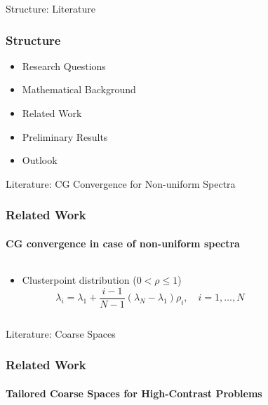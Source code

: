 \begin{frame}[label=literature]{Structure: Literature}
    \frametitle{Structure}
    \begin{itemize}
        \item Research Questions
        \item Mathematical Background
        \item {\color{tud grapefruit}Related Work}
        \item Preliminary Results
        \item Outlook
    \end{itemize}
\end{frame}

\footerinfootnotestrue
\begin{frame}[label=literature,fragile]{Literature: CG Convergence for Non-uniform Spectra}
    \frametitle{Related Work}
    \framesubtitle{CG convergence in case of non-uniform spectra}
    \begin{columns}[T,onlytextwidth]
        \begin{column}{.5\textwidth}
            \begin{itemize}
                \item<1-> Clusterpoint distribution ($0 < \rho \leq 1$)\cite{cg_convrate_Strakos1991}
                \begin{equation*}
                    \lambda_i = \lambda_1 + \frac{i-1}{N-1}(\lambda_N - \lambda_1)\rho_i, \quad i = 1, \dots, N
                \end{equation*}
            \end{itemize}
        \end{column}
        \begin{column}{.55\textwidth}
        \end{column}
    \end{columns}
\end{frame}

\footerinfootnotesfalse
\begin{frame}[label=literature]{Literature: Coarse Spaces}
    \frametitle{Related Work}
    \framesubtitle{Tailored Coarse Spaces for High-Contrast Problems}
\end{frame}
